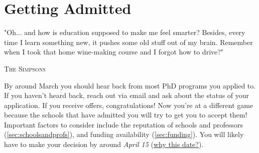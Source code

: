 \documentclass[oneside,11pt]{book}
\begin{document}








%


\chapter{Getting Admitted}\label{sec:accepted}

\epigraph{"Oh... and how is education supposed to make me feel smarter? Besides, every time I learn something new, it pushes some old stuff out of my brain. Remember when I took that home wine-making course and I forgot how to drive?"}{\textsc{The Simpsons}}

By around March you should hear back from most PhD programs you applied to. If you haven't heard back, reach out via email and ask about the status of your application.
If you receive offers, congratulations!  Now you're at a different game because the schools that have admitted you will try to get you to accept them!  Important factors to consider include the reputation of schools and professors (\autoref{sec:schoolsandprofs}), and funding availability (\autoref{sec:funding}). You will likely have to make your decision by around \emph{April 15} (\href{https://cgsnet.org/wp-content/uploads/2024/01/CGS_April15_Resolution_Jan312024.pdf}{why this date?}).
\end{document}
